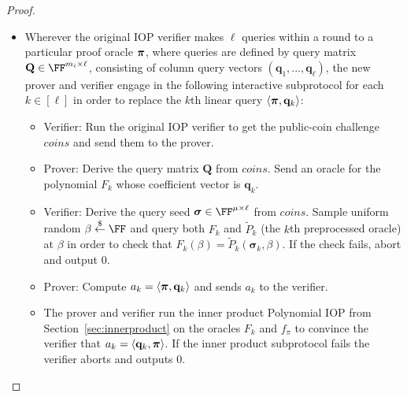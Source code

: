 \begin{proof}
\begin{itemize}
\item Wherever the original IOP verifier makes $\ell$ queries within a round to a particular proof oracle $\boldsymbol{\pi}$, where queries are defined by query matrix $\mathbf{Q} \in \FF^{m_i \times \ell}$, consisting of column query vectors $(\mathbf{q}_1,...,\mathbf{q}_\ell)$, the new prover and verifier engage in the following interactive subprotocol for each $k \in [\ell]$ in order to replace the $k$th linear query $\langle \boldsymbol{\pi}, \mathbf{q}_k \rangle$: 

\begin{itemize}[nolistsep]
\item Verifier: Run the original IOP verifier to get the public-coin challenge $\mathit{coins}$ and send them to the prover.
 \item Prover: Derive the query matrix $\mathbf{Q}$ from $\mathit{coins}$. Send an oracle for the polynomial $F_k$ whose coefficient vector is $\mathbf{q}_k$. 
 \item Verifier: Derive the query seed $\boldsymbol{\sigma} \in \FF^{\mu \times \ell}$ from $\mathit{coins}$. Sample uniform random $\beta \sample \FF$ and query both $F_k$ and $\tilde{P}_k$ (the $k$th preprocessed oracle) at $\beta$ in order to check that $F_k (\beta) = \tilde{P}_k(\boldsymbol{\sigma}_k, \beta)$. If the check fails, abort and output 0.
 
 
 \item Prover: Compute $a_k = \langle \boldsymbol{\pi}, \mathbf{q}_k \rangle$ and sends $a_k$ to the verifier. 
 
 \item The prover and verifier run the inner product Polynomial IOP from Section~\ref{sec:innerproduct} on the oracles $F_k$ and $f_\pi$ to convince the verifier that $a_k = \langle \mathbf{q}_k, \boldsymbol{\pi} \rangle$. If the inner product subprotocol fails the verifier aborts and outputs 0.  
 \end{itemize}
 

\end{itemize}
\end{proof}
